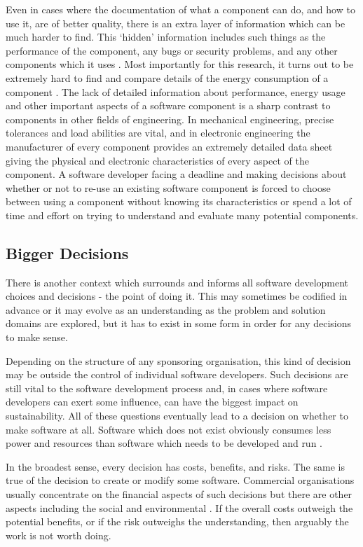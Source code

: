 Even in cases where the documentation of what a component can do, and how to use it, are of better quality, there is an extra layer of information which can be much harder to find. This `hidden' information includes such things as the performance of the component, any bugs or security problems, and any other components which it uses \citep{Harrison2022}  \citep{Spinellis2019}. Most importantly for this research, it turns out to be extremely hard to find and compare details of the energy consumption of a component \citep{Field2014} \citep{Jagroep2016a}. The lack of detailed information about performance, energy usage and other important aspects of a software component is a sharp contrast to components in other fields of engineering. In mechanical engineering, precise tolerances and load abilities are vital, and in electronic engineering the manufacturer of every component provides an extremely detailed data sheet giving the physical and electronic characteristics of every aspect of the component. A software developer facing a deadline and making decisions about whether or not to re-use an existing software component is forced to choose between using a component without knowing its characteristics or spend a lot of time and effort on trying to understand and evaluate many potential components.

\subsection{Bigger Decisions}

There is another context which surrounds and informs all software development choices and decisions - the point of doing it. This may sometimes be codified in advance or it may evolve as an understanding as the problem and solution domains are explored, but it has to exist in some form in order for any decisions to make sense.

Depending on the structure of any sponsoring organisation, this kind of decision may be outside the control of individual software developers. Such decisions are still vital to the software development process and, in cases where software developers can exert some influence, can have the biggest impact on sustainability. All of these questions eventually lead to a decision on whether to make software at all. Software which does not exist obviously consumes less power and resources than software which needs to be developed and run \citep{Linders2023}.

In the broadest sense, every decision has costs, benefits, and risks. The same is true of the decision to create or modify some software. Commercial organisations usually concentrate on the financial aspects of such decisions but there are other aspects including the social and environmental \citep{MoisesdeSouza2023} \citep{Barbier1990}. If the overall costs outweigh the potential benefits, or if the risk outweighs the understanding, then arguably the work is not worth doing.

